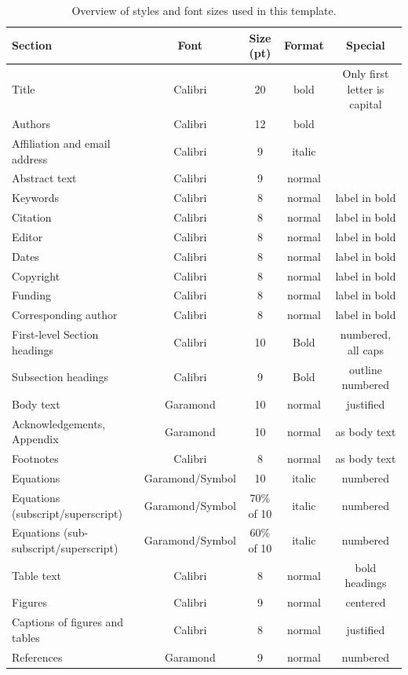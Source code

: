 \documentclass[10pt]{imeko_acta}
\begin{document}
\begin{table}[!h]
	\caption{Overview of styles and font sizes used in this template.}
	\label{tab:tab1}
	\centering
	\begin{tabular}{lcccc}
		\toprule
		Section & Font & Size (pt) & Format & Special \\
		\midrule
		Title & Calibri & 20 & bold & Only first letter is capital \\
		Authors & Calibri & 12 & bold &  \\
		Affiliation and email address & Calibri & 9 & italic &  \\
		Abstract text & Calibri & 9 & normal &  \\
		Keywords & Calibri & 8 & normal & label in bold \\
		Citation & Calibri & 8 & normal & label in bold \\
		Editor & Calibri & 8 & normal & label in bold \\
		Dates & Calibri & 8 & normal & label in bold \\
		Copyright & Calibri & 8 & normal & label in bold \\
		Funding & Calibri & 8 & normal & label in bold \\
		Corresponding author & Calibri & 8 & normal & label in bold \\
		First-level Section headings  & Calibri & 10 & Bold & numbered, all caps \\
		Subsection headings & Calibri & 9 & Bold & outline numbered \\
		Body text & Garamond & 10 & normal & justified \\
		Acknowledgements, Appendix & Garamond & 10 & normal & as body text \\
		Footnotes  & Calibri & 8 & normal & as body text \\
		Equations & Garamond/Symbol & 10 & italic & numbered \\
		Equations (subscript/superscript) & Garamond/Symbol & 70\% of 10 & italic & numbered \\
		Equations (sub-subscript/superscript) & Garamond/Symbol & 60\% of 10 & italic & numbered \\
		Table text & Calibri & 8 & normal & bold headings \\
		Figures & Calibri & 9 & normal & centered \\
		Captions of figures and tables & Calibri & 8 & normal & justified \\
		References & Garamond & 9 & normal & numbered \\
		\bottomrule
	\end{tabular}
\end{table}
\end{document}
